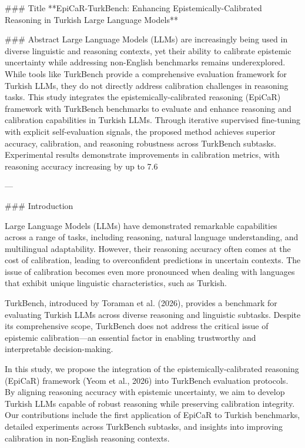 ### Title  
**EpiCaR-TurkBench: Enhancing Epistemically-Calibrated Reasoning in Turkish Large Language Models**

### Abstract  
Large Language Models (LLMs) are increasingly being used in diverse linguistic and reasoning contexts, yet their ability to calibrate epistemic uncertainty while addressing non-English benchmarks remains underexplored. While tools like TurkBench provide a comprehensive evaluation framework for Turkish LLMs, they do not directly address calibration challenges in reasoning tasks. This study integrates the epistemically-calibrated reasoning (EpiCaR) framework with TurkBench benchmarks to evaluate and enhance reasoning and calibration capabilities in Turkish LLMs. Through iterative supervised fine-tuning with explicit self-evaluation signals, the proposed method achieves superior accuracy, calibration, and reasoning robustness across TurkBench subtasks. Experimental results demonstrate improvements in calibration metrics, with reasoning accuracy increasing by up to 7.6%

---

### Introduction  

Large Language Models (LLMs) have demonstrated remarkable capabilities across a range of tasks, including reasoning, natural language understanding, and multilingual adaptability. However, their reasoning accuracy often comes at the cost of calibration, leading to overconfident predictions in uncertain contexts. The issue of calibration becomes even more pronounced when dealing with languages that exhibit unique linguistic characteristics, such as Turkish. 

TurkBench, introduced by Toraman et al. (2026), provides a benchmark for evaluating Turkish LLMs across diverse reasoning and linguistic subtasks. Despite its comprehensive scope, TurkBench does not address the critical issue of epistemic calibration—an essential factor in enabling trustworthy and interpretable decision-making.

In this study, we propose the integration of the epistemically-calibrated reasoning (EpiCaR) framework (Yeom et al., 2026) into TurkBench evaluation protocols. By aligning reasoning accuracy with epistemic uncertainty, we aim to develop Turkish LLMs capable of robust reasoning while preserving calibration integrity. Our contributions include the first application of EpiCaR to Turkish benchmarks, detailed experiments across TurkBench subtasks, and insights into improving calibration in non-English reasoning contexts.

